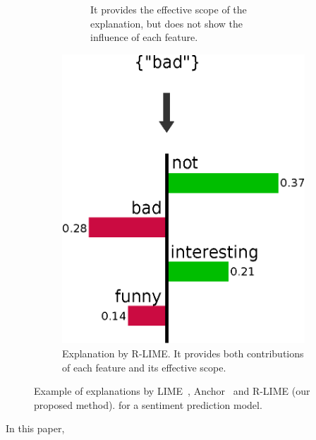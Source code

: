 \documentclass[11pt]{article}
\begin{document}
\begin{figure}[tbp]
\begin{subfigure}[t]{0.45\textwidth}
\begin{subfigure}[t]{\textwidth}
{        It provides the effective scope of the explanation,
        but does not show the influence of each feature.
      }\label{fig:example-anchor}
    \end{subfigure}
  \end{subfigure}
  \hspace{0.3cm}
  \begin{subfigure}[t]{0.45\textwidth}
    \centering
    \ifnum{}
      \vspace{-1.79cm}
    \else
      \vspace{-2.24cm}
    \fi
    \includegraphics[scale=\scale]{example-rlime}
    \caption{%
      Explanation by R-LIME\@.
      It provides both contributions of each feature and
      its effective scope.
    }\label{fig:example-rlime}
  \end{subfigure}
  \caption[Example of explanations by LIME, Anchor and R-LIME]{%
    Example of explanations by LIME~\cite{ribeiro2016why},
    Anchor~\cite{ribeiro2018anchors} and R-LIME (our proposed method).
    for a sentiment prediction model.
  }\label{fig:example}
\end{figure}
In this paper,
\end{document}
